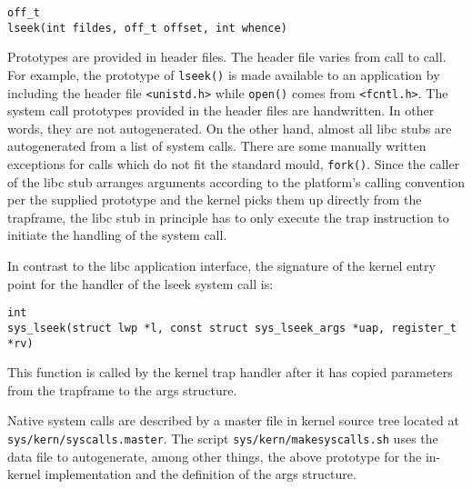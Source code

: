 {\small
\begin{verbatim}
off_t
lseek(int fildes, off_t offset, int whence)
\end{verbatim}}

Prototypes are provided in header files.  The header file
varies from call to call.  For example, the prototype of
\texttt{lseek()} is made available to an application by including
the header file \texttt{<unistd.h>} while \texttt{open()} comes from
\texttt{<fcntl.h>}.  The system call prototypes provided in the
header files are handwritten.  In other words, they are not autogenerated.
On the other hand, almost all libc stubs are autogenerated
from a list of system calls.  There are some manually written
exceptions for calls which do not fit the standard mould, \eg \texttt{fork()}.
Since the caller of the libc stub arranges arguments according to
the platform's calling convention per the supplied prototype and the kernel
picks them up directly from the trapframe, the libc stub in principle
has to only execute the trap instruction to initiate the handling of
the system call.

In contrast to the libc application interface, the signature of
the kernel entry point for the handler of the lseek system call
is:

{\small
\begin{verbatim}
int
sys_lseek(struct lwp *l, const struct sys_lseek_args *uap, register_t *rv)
\end{verbatim}}

This function is called by the kernel trap handler after it has copied
parameters from the trapframe to the args structure.

Native system calls are described by a master file in kernel source
tree located at \texttt{sys/kern/syscalls.master}.  The script
\texttt{sys/kern/makesyscalls.sh} uses the data file to autogenerate,
among other things, the above prototype for the in-kernel implementation
and the definition of the args structure.

